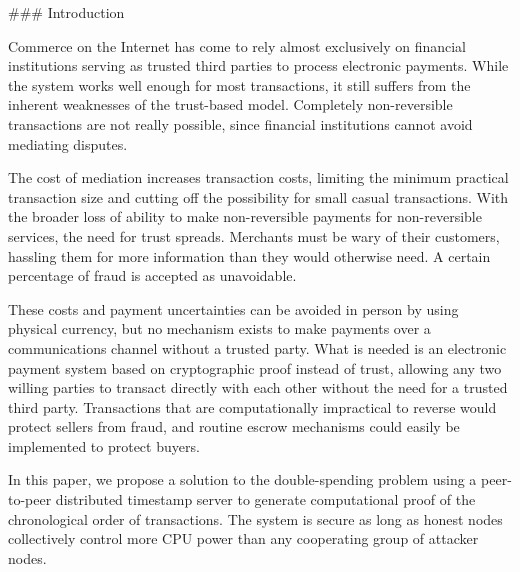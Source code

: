 ### Introduction

Commerce on the Internet has come to rely almost exclusively on financial institutions serving as trusted third parties to process electronic payments. While the system works well enough for most transactions, it still suffers from the inherent weaknesses of the trust-based model. Completely non-reversible transactions are not really possible, since financial institutions cannot avoid mediating disputes.

The cost of mediation increases transaction costs, limiting the minimum practical transaction size and cutting off the possibility for small casual transactions. With the broader loss of ability to make non-reversible payments for non-reversible services, the need for trust spreads. Merchants must be wary of their customers, hassling them for more information than they would otherwise need. A certain percentage of fraud is accepted as unavoidable.

These costs and payment uncertainties can be avoided in person by using physical currency, but no mechanism exists to make payments over a communications channel without a trusted party. What is needed is an electronic payment system based on cryptographic proof instead of trust, allowing any two willing parties to transact directly with each other without the need for a trusted third party. Transactions that are computationally impractical to reverse would protect sellers from fraud, and routine escrow mechanisms could easily be implemented to protect buyers.

In this paper, we propose a solution to the double-spending problem using a peer-to-peer distributed timestamp server to generate computational proof of the chronological order of transactions. The system is secure as long as honest nodes collectively control more CPU power than any cooperating group of attacker nodes.